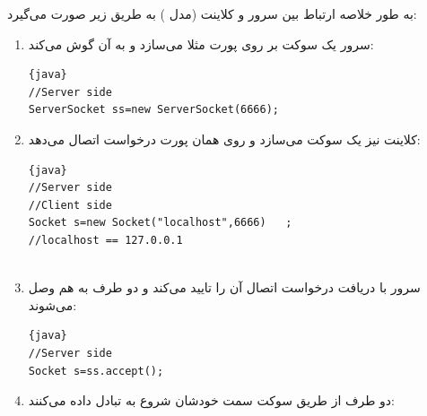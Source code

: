 \documentclass[]{article}
\begin{document}
\begin{flushleft}
\href{https://www.baeldung.com/udp-in-java}{\textcolor{blue}{\underline{}}}
\end{flushleft}

\begin{flushleft}
\href{TCP vs UDP - Difference and Comparison}{\textcolor{blue}{\underline{}}}
\end{flushleft}


به طور خلاصه ارتباط بین سرور و کلاینت (مدل ) به طریق زیر صورت می‌گیرد:

\begin{enumerate}

\item
سرور یک سوکت بر روی پورت مثلا  می‌سازد و به آن گوش می‌کند:

\begin{latin}

\begin{lstlisting}{java}
//Server side
ServerSocket ss=new ServerSocket(6666);  

\end{lstlisting}

\end{latin}

\item
کلاینت نیز یک سوکت می‌سازد و روی همان پورت درخواست اتصال می‌دهد:

\begin{latin}

\begin{lstlisting}{java}
//Server side
//Client side
Socket s=new Socket("localhost",6666)	;
//localhost == 127.0.0.1
 

\end{lstlisting}

\end{latin}

\item
سرور با دریافت درخواست اتصال آن‌ را تایید می‌کند و دو طرف به هم وصل می‌شوند:


\begin{latin}

\begin{lstlisting}{java}
//Server side
Socket s=ss.accept();

\end{lstlisting}

\end{latin}

\item
دو طرف از طریق سوکت سمت خودشان شروع به تبادل داده می‌کنند:



\end{enumerate}
\end{document}
